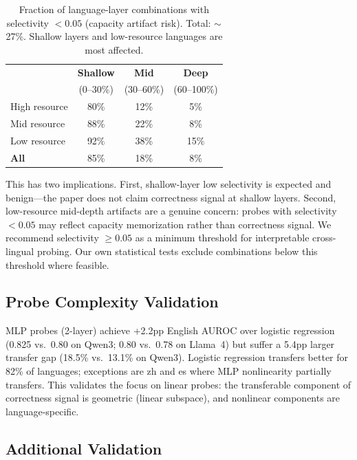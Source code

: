 \documentclass[11pt,a4paper]{article}
\begin{document}
\begin{table}[t]
\centering
\small
\begin{tabular}{lccc}
\toprule
& \textbf{Shallow} & \textbf{Mid} & \textbf{Deep} \\
& (0--30\%) & (30--60\%) & (60--100\%) \\
\midrule
High resource & 80\% & 12\% & 5\% \\
Mid resource & 88\% & 22\% & 8\% \\
Low resource & 92\% & 38\% & 15\% \\
\midrule
\textbf{All} & 85\% & 18\% & 8\% \\
\bottomrule
\end{tabular}
\caption{Fraction of language-layer combinations with selectivity $< 0.05$ (capacity artifact risk). Total: ${\sim}$27\%. Shallow layers and low-resource languages are most affected.}
\label{tab:control}
\end{table}

This has two implications.
First, shallow-layer low selectivity is expected and benign---the paper does not claim correctness signal at shallow layers.
Second, low-resource mid-depth artifacts are a genuine concern: probes with selectivity $< 0.05$ may reflect capacity memorization rather than correctness signal.
We recommend selectivity $\geq 0.05$ as a minimum threshold for interpretable cross-lingual probing.
Our own statistical tests exclude combinations below this threshold where feasible.

\subsection{Probe Complexity Validation}
\label{sec:probe_complexity}

MLP probes (2-layer) achieve +2.2pp English AUROC over logistic regression (0.825 vs.\ 0.80 on Qwen3; 0.80 vs.\ 0.78 on Llama~4) but suffer a 5.4pp larger transfer gap (18.5\% vs.\ 13.1\% on Qwen3).
Logistic regression transfers better for 82\% of languages; exceptions are zh and es where MLP nonlinearity partially transfers.
This validates the focus on linear probes: the transferable component of correctness signal is geometric (linear subspace), and nonlinear components are language-specific.

\subsection{Additional Validation}
\label{sec:quant}
\end{document}
